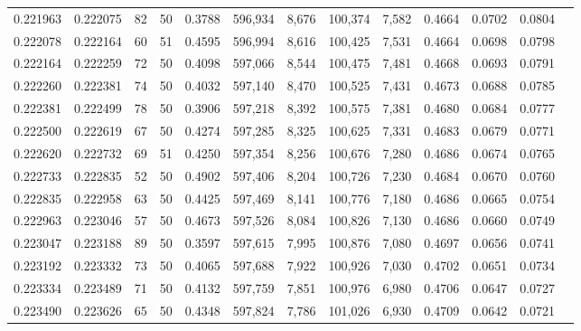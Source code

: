 \begin{tabular}{rrrrrrrrrrrrr}
0.221963 & 0.222075 &    82 &  50 &                                     0.3788 & 596,934 &   8,676 & 100,374 &   7,582 & 0.4664 & 0.0702 & 0.0804 \\
0.222078 & 0.222164 &    60 &  51 &                                     0.4595 & 596,994 &   8,616 & 100,425 &   7,531 & 0.4664 & 0.0698 & 0.0798 \\
0.222164 & 0.222259 &    72 &  50 &                                     0.4098 & 597,066 &   8,544 & 100,475 &   7,481 & 0.4668 & 0.0693 & 0.0791 \\
0.222260 & 0.222381 &    74 &  50 &                                     0.4032 & 597,140 &   8,470 & 100,525 &   7,431 & 0.4673 & 0.0688 & 0.0785 \\
0.222381 & 0.222499 &    78 &  50 &                                     0.3906 & 597,218 &   8,392 & 100,575 &   7,381 & 0.4680 & 0.0684 & 0.0777 \\
0.222500 & 0.222619 &    67 &  50 &                                     0.4274 & 597,285 &   8,325 & 100,625 &   7,331 & 0.4683 & 0.0679 & 0.0771 \\
0.222620 & 0.222732 &    69 &  51 &                                     0.4250 & 597,354 &   8,256 & 100,676 &   7,280 & 0.4686 & 0.0674 & 0.0765 \\
0.222733 & 0.222835 &    52 &  50 &                                     0.4902 & 597,406 &   8,204 & 100,726 &   7,230 & 0.4684 & 0.0670 & 0.0760 \\
0.222835 & 0.222958 &    63 &  50 &                                     0.4425 & 597,469 &   8,141 & 100,776 &   7,180 & 0.4686 & 0.0665 & 0.0754 \\
0.222963 & 0.223046 &    57 &  50 &                                     0.4673 & 597,526 &   8,084 & 100,826 &   7,130 & 0.4686 & 0.0660 & 0.0749 \\
0.223047 & 0.223188 &    89 &  50 &                                     0.3597 & 597,615 &   7,995 & 100,876 &   7,080 & 0.4697 & 0.0656 & 0.0741 \\
0.223192 & 0.223332 &    73 &  50 &                                     0.4065 & 597,688 &   7,922 & 100,926 &   7,030 & 0.4702 & 0.0651 & 0.0734 \\
0.223334 & 0.223489 &    71 &  50 &                                     0.4132 & 597,759 &   7,851 & 100,976 &   6,980 & 0.4706 & 0.0647 & 0.0727 \\
0.223490 & 0.223626 &    65 &  50 &                                     0.4348 & 597,824 &   7,786 & 101,026 &   6,930 & 0.4709 & 0.0642 & 0.0721 \\

\end{tabular}
